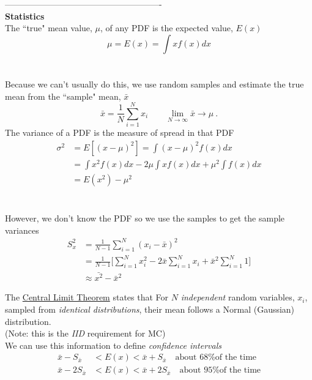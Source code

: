 \documentclass[12pt, answers]{exam}
\begin{document}
-------------------------------------------------------\\
\textbf{Statistics}\\
The ``true" mean value, $\mu$, of any PDF is the expected value, $E(x)$
\ifprintanswers
\[
\mu = E(x) = \int x f(x) dx
\]
\else
\\ \vspace*{1em}\\
\fi
Because we can't usually do this, we use random samples and estimate the true mean from the ``sample" mean, $\bar{x}$
\[
\bar{x} = \frac{1}{N}\sum_{i=1}^N x_i \qquad \lim_{N \to \infty} \bar{x} \rightarrow \mu\:.
\]
The variance of a PDF is the measure of spread in that PDF
\ifprintanswers
\begin{align*}
\sigma^2 &= E[(x - \mu)^2] = \int (x - \mu)^2 f(x) dx \\
&= \int x^2 f(x) dx - 2 \mu \int x f(x) dx + \mu^2 \int f(x) dx\\
&= E(x^2) - \mu^2
\end{align*}
\else
\\ \vspace*{5em}\\
\fi
%
However, we don't know the PDF so we use the samples to get the sample variances
\begin{align*}
S_x^2 &= \frac{1}{N-1}\sum_{i=1}^N (x_i - \bar{x})^2 \\
&= \frac{1}{N-1} \biggl[\sum_{i=1}^N x_i^2 - 2 \bar{x}\sum_{i=1}^N x_i + \bar{x}^2 \sum_{i=1}^N 1 \biggr] \\
&\approx \bar{x^2} - \bar{x}^2
\end{align*}

The \underline{Central Limit Theorem} states that
For $N$ \textit{independent} random variables, $x_i$, sampled from \textit{identical distributions}, their mean follows a Normal (Gaussian) distribution.\\
(Note: this is the \textit{IID} requirement for MC)\\
We can use this information to define \textit{confidence intervals}
\begin{align*}
\bar{x} - S_{\bar{x}} &< E(x) < \bar{x} + S_{\bar{x}} \quad \text{about 68\% of the time}\\
\bar{x} - 2S_{\bar{x}} &< E(x) < \bar{x} + 2S_{\bar{x}} \quad \text{about 95\% of the time}
\end{align*}
\end{document}
